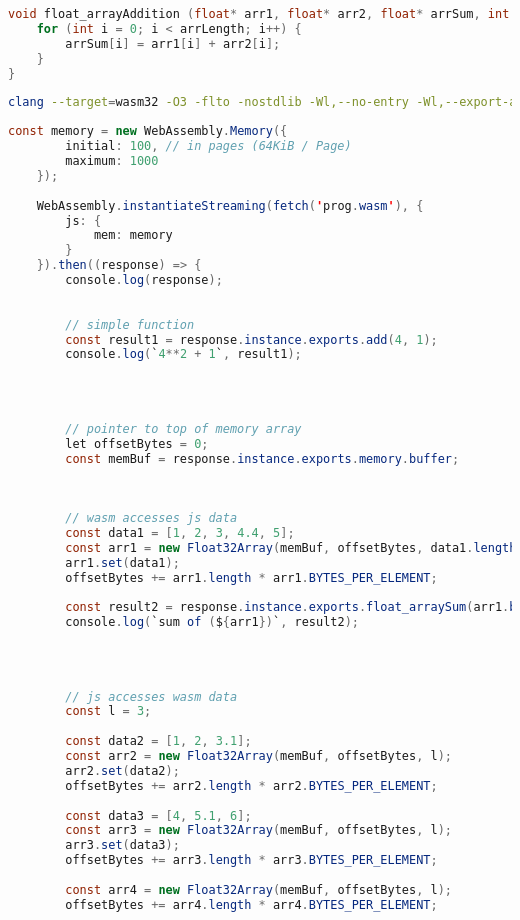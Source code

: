 {\begin{lstlisting}[language=c]
void float_arrayAddition (float* arr1, float* arr2, float* arrSum, int arrLength) {
    for (int i = 0; i < arrLength; i++) {
        arrSum[i] = arr1[i] + arr2[i];
    }
}
\end{lstlisting}

\begin{lstlisting}[language=bash]
    clang --target=wasm32 -O3 -flto -nostdlib -Wl,--no-entry -Wl,--export-all -Wl,--lto-O3 -o prog.wasm prog.c
\end{lstlisting}

\begin{lstlisting}[language=java]
    const memory = new WebAssembly.Memory({
        initial: 100, // in pages (64KiB / Page)
        maximum: 1000
    });
    
    WebAssembly.instantiateStreaming(fetch('prog.wasm'), {
        js: {
            mem: memory
        }
    }).then((response) => {
        console.log(response);
    
    
        // simple function
        const result1 = response.instance.exports.add(4, 1);
        console.log(`4**2 + 1`, result1);
    
    
    
    
        // pointer to top of memory array
        let offsetBytes = 0;
        const memBuf = response.instance.exports.memory.buffer;
    
    
    
        // wasm accesses js data
        const data1 = [1, 2, 3, 4.4, 5];
        const arr1 = new Float32Array(memBuf, offsetBytes, data1.length);
        arr1.set(data1);
        offsetBytes += arr1.length * arr1.BYTES_PER_ELEMENT;
        
        const result2 = response.instance.exports.float_arraySum(arr1.byteOffset, arr1.length);
        console.log(`sum of (${arr1})`, result2);
    
    
    
    
        // js accesses wasm data
        const l = 3;
    
        const data2 = [1, 2, 3.1];
        const arr2 = new Float32Array(memBuf, offsetBytes, l);
        arr2.set(data2);
        offsetBytes += arr2.length * arr2.BYTES_PER_ELEMENT;
    
        const data3 = [4, 5.1, 6];
        const arr3 = new Float32Array(memBuf, offsetBytes, l);
        arr3.set(data3);
        offsetBytes += arr3.length * arr3.BYTES_PER_ELEMENT;
    
        const arr4 = new Float32Array(memBuf, offsetBytes, l);
        offsetBytes += arr4.length * arr4.BYTES_PER_ELEMENT;
    

\end{lstlisting}}
